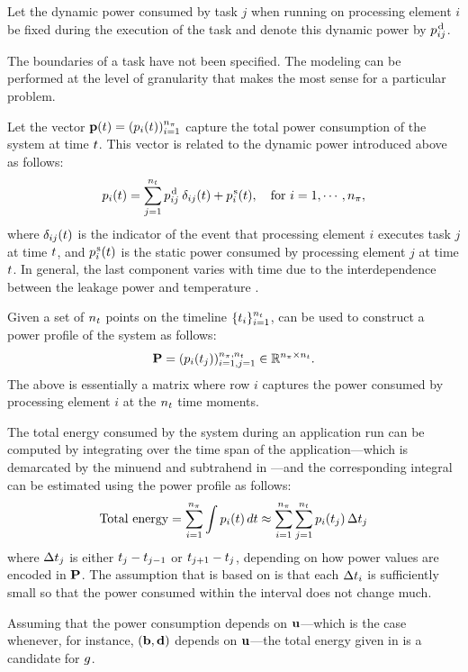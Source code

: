 Let the dynamic power consumed by task $j$ when running on processing element
$i$ be fixed during the execution of the task and denote this dynamic power by
$p^{\text{\kern0.1emd}}_{ij}$.

\begin{remark}
The boundaries of a task have not been specified. The modeling can be performed
at the level of granularity that makes the most sense for a particular problem.
\end{remark}

Let the vector $\mathbf{p}(t) = (p_i(t))_{i = 1}^{{n_\pi}}$ capture the total power
consumption of the system at time $t$. This vector is related to the dynamic
power introduced above as follows:
\begin{equation} \elab{power}
  \p_i(\t) = \sum_{j = 1}^\nt \p^\dynamic_{ij} \: \delta_{ij} (\t) + \p^\static_i(\t), \hspace{1em} \text{for $i = 1, \cdots, \np$},
\end{equation}
where $\delta_{ij}(t)$ is the indicator of the event that processing element
$i$ executes task $j$ at time $t$, and $p^{\text{\kern0.1ems}}_i(t)$ is the static power
consumed by processing element $j$ at time $t$. In general, the last component
varies with time due to the interdependence between the leakage power and
temperature \cite{liu2007}.

Given a set of ${n_t}$ points on the timeline $\{ t_i \}_{i = 1}^{n_t}$,
 can be used to construct a power profile of the system as follows:
\[
  \mathbf{P} = (p_i(t_j))_{i = 1, j = 1}^{{n_\pi}, {n_t}} \in \mathbb{R}^{{n_\pi} \times {n_t}}.
\]
The above is essentially a matrix where row $i$ captures the power consumed by
processing element $i$ at the ${n_t}$ time moments.

The total energy consumed by the system during an application run can be
computed by integrating  over the time span of the
application---which is demarcated by the minuend and subtrahend in
---and the corresponding integral can be estimated using
the power profile as follows:
\begin{equation} \elab{total-energy}
  \text{Total energy} = \sum_{i = 1}^\np \int \p_i(\t) \, d\t \approx \sum_{i = 1}^\np \sum_{j = 1}^\ns \p_i(\t_j) \, \Delta\t_j
\end{equation}
where $\Delta t_j$ is either $t_j - t_{j - 1}$ or $t_{j + 1} - t_j$,
depending on how power values are encoded in $\mathbf{P}$. The assumption that
 is based on is that each $\Delta t_i$ is sufficiently small
so that the power consumed within the interval does not change much.

Assuming that the power consumption depends on $\mathbf{u}$---which is the case
whenever, for instance, $(\mathbf{b}, \mathbf{d})$ depends on $\mathbf{u}$---the total energy given
in  is a candidate for $g$.
